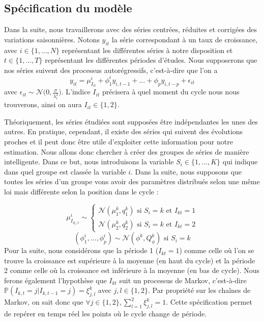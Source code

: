 \documentclass[10pt,french,french]{article}
\begin{document}
\hypertarget{spuxe9cification-du-moduxe8le}{%
\subsection{Spécification du modèle}\label{spuxe9cification-du-moduxe8le}}

Dans la suite, nous travaillerons avec des séries centrées, réduites et corrigées des variations saisonnières.
Notons \(y_{it}\) la série correspondant à un taux de croissance, avec \(i \in \{1, \dots, N\}\) représentant les différentes séries à notre disposition et \(t \in \{1, \dots, T\}\) représentant les différentes périodes d'études.
Nous supposerons que nos séries suivent des processus autorégressifs, c'est-à-dire que l'on a \[ y_{it} = \mu_{I_{it}}^{i} + \phi_1^i y_{i,t-1} + \dots + \phi_p y_{i,t-p} + \epsilon_{it}\] avec \(\epsilon_{it} \sim \mathcal{N}\big(0, \displaystyle\frac{\sigma}{\lambda_i^2}\big)\).
L'indice \(I_{it}\) précisera à quel moment du cycle nous nous trouverons, ainsi on aura \(I_{it} \in \{1,2\}\).

Théoriquement, les séries étudiées sont supposées être indépendantes les unes des autres.
En pratique, cependant, il existe des séries qui suivent des évolutions proches et il peut donc être utile d'exploiter cette information pour notre estimation.
Nous allons donc chercher à créer des groupes de séries de manière intelligente.
Dans ce but, nous introduisons la variable \(S_i \in \{1, \dots, K \}\) qui indique dans quel groupe est classée la variable \(i\).
Dans la suite, nous supposons que toutes les séries d'un groupe vons avoir des paramètres distribués selon une même loi mais différente selon la position dans le cycle :

\[ \mu_{I_{S_i,t}}^i \sim \begin{cases}
\mathcal{N}(\mu_1^k,q_1^k) \text{ si } S_i = k \text{ et } I_{kt} = 1\\
\mathcal{N}(\mu_2^k,q_2^k) \text{ si } S_i = k \text{ et } I_{kt} = 2
\end{cases} \] \[ (\phi_1^i, \dots, \phi_p^i) \sim \mathcal{N}(\phi^k,Q_{\phi}^k) \text{ si } S_i = k\] Pour la suite, nous considérons que la période 1 (\(I_{kt} = 1\)) comme celle où l'on se trouve la croissance est supérieure à la moyenne (en haut du cycle) et la période 2 comme celle où la croissance est inférieure à la moyenne (en bas de cycle).
Nous ferons également l'hypothèse que \(I_{kt}\) suit un processus de Markov, c'est-à-dire \(\mathbb{P}(I_{k,t} = j | I_{k,t-1} = j) = \xi_{j,l}^k\) avec \(j,l \in \{1,2\}\).
Par propriété sur les chaînes de Markov, on sait donc que \(\forall j \in \{1,2\}, \sum\limits_{l=1}^2 \xi_{j,l}^k = 1\).
Cette spécification permet de repérer en temps réel les points où le cycle change de période.
\end{document}
